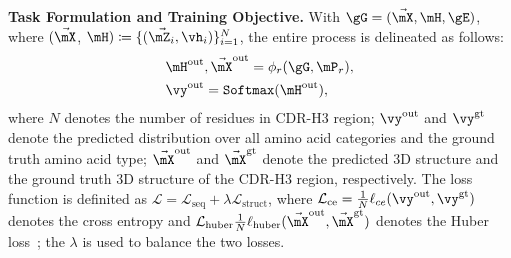 \textbf{Task Formulation and Training Objective.}
With $\gG = (\Vec{\mX}, \mH, \gE)$, where $(\Vec{\mX}$, $\mH )\coloneqq \{ (\Vec{\mZ_{i}}, \vh_{i}) \} ^{N}_{i=1}$, the entire process is delineated as follows:
\begin{equation}\label{eq:task_antibody}
\begin{aligned}
    &\mH^{\text{out}}, \Vec{\mX}^{\text{out}} = \phi_{r} (\gG, \mP_{r}), \\
    &\vy^{\text{out}} = \texttt{Softmax}(\mH^{\text{out}}), \\
\end{aligned}
\end{equation}
where $N$ denotes the number of residues in CDR-H3 region; $\vy^{\text{out}}$ and $\vy^{\text{gt}}$ denote the predicted distribution over all amino acid categories and the ground truth amino acid type; $\Vec{\mX}^{\text{out}}$ and $\Vec{\mX}^{\text{gt}}$ denote the predicted 3D structure and the ground truth 3D structure of the CDR-H3 region, respectively. The loss function is definited as $\mathcal{L} = \mathcal{L}_{\mathrm{seq}} + \lambda \mathcal{L}_{\mathrm{struct}}$, where $\mathcal{L} _{\mathrm{ce}}= \frac{1}{N}\ell_{ce}(\vy^{\text{out}}, \vy^{\text{gt}})$ denotes the cross entropy and $\mathcal{L} _{\mathrm{huber}}\frac{1}{N}\ell_{\mathrm{huber}}(\Vec{\mX}^{\text{out}}, \Vec{\mX}^{\text{gt}})$ denotes the Huber loss~\citep{huber1992robust}; the $\lambda$ is used to balance the two losses.
